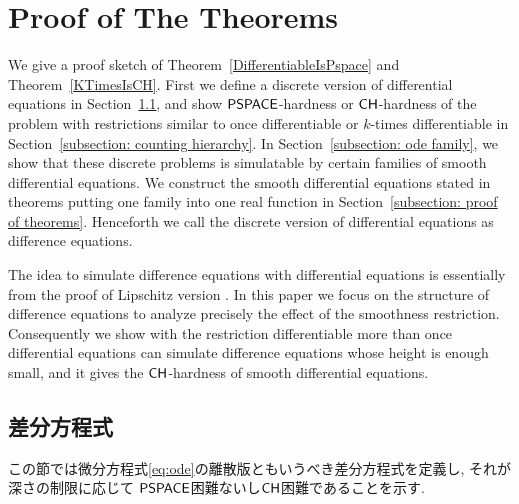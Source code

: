 \section{Proof of The Theorems}
\label{section:differentiable}

We give a proof sketch of Theorem~\ref{DifferentiableIsPspace} and Theorem~\ref{KTimesIsCH}.
First we define a discrete version of differential equations in Section~\ref{section:divp},
and show $\mathsf{PSPACE}$-hardness or $\mathsf{CH}$-hardness of the problem with 
restrictions similar to once differentiable or $k$-times differentiable
in Section~\ref{subsection: counting hierarchy}.
In Section~\ref{subsection: ode family}, 
we show that these discrete problems is simulatable
by certain families of smooth differential equations.
We construct the smooth differential equations stated in theorems
putting one family into one real function
in Section~\ref{subsection: proof of theorems}.
Henceforth we call the discrete version of differential equations as difference equations.

The idea to simulate difference equations with differential equations
is essentially from the proof of Lipschitz version \cite{kawamura2010lipschitz}.
In this paper we focus on the structure of difference equations
to analyze precisely the effect of the smoothness restriction.
Consequently we show with the restriction differentiable more than once
differential equations can simulate difference equations whose height is enough small, and it gives the $\mathsf{CH}$-hardness of smooth differential equations.

\subsection{差分方程式}
\label{section:divp}

この節では微分方程式\eqref{eq:ode}の離散版ともいうべき差分方程式を定義し, 
それが深さの制限に応じて
$\mathsf{PSPACE}$困難ないし$\mathsf{CH}$困難であることを示す.

